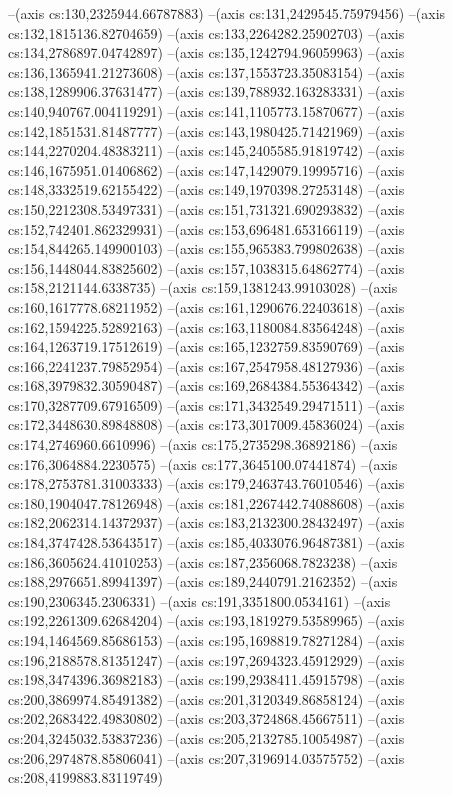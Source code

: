 --(axis cs:130,2325944.66787883)
--(axis cs:131,2429545.75979456)
--(axis cs:132,1815136.82704659)
--(axis cs:133,2264282.25902703)
--(axis cs:134,2786897.04742897)
--(axis cs:135,1242794.96059963)
--(axis cs:136,1365941.21273608)
--(axis cs:137,1553723.35083154)
--(axis cs:138,1289906.37631477)
--(axis cs:139,788932.163283331)
--(axis cs:140,940767.004119291)
--(axis cs:141,1105773.15870677)
--(axis cs:142,1851531.81487777)
--(axis cs:143,1980425.71421969)
--(axis cs:144,2270204.48383211)
--(axis cs:145,2405585.91819742)
--(axis cs:146,1675951.01406862)
--(axis cs:147,1429079.19995716)
--(axis cs:148,3332519.62155422)
--(axis cs:149,1970398.27253148)
--(axis cs:150,2212308.53497331)
--(axis cs:151,731321.690293832)
--(axis cs:152,742401.862329931)
--(axis cs:153,696481.653166119)
--(axis cs:154,844265.149900103)
--(axis cs:155,965383.799802638)
--(axis cs:156,1448044.83825602)
--(axis cs:157,1038315.64862774)
--(axis cs:158,2121144.6338735)
--(axis cs:159,1381243.99103028)
--(axis cs:160,1617778.68211952)
--(axis cs:161,1290676.22403618)
--(axis cs:162,1594225.52892163)
--(axis cs:163,1180084.83564248)
--(axis cs:164,1263719.17512619)
--(axis cs:165,1232759.83590769)
--(axis cs:166,2241237.79852954)
--(axis cs:167,2547958.48127936)
--(axis cs:168,3979832.30590487)
--(axis cs:169,2684384.55364342)
--(axis cs:170,3287709.67916509)
--(axis cs:171,3432549.29471511)
--(axis cs:172,3448630.89848808)
--(axis cs:173,3017009.45836024)
--(axis cs:174,2746960.6610996)
--(axis cs:175,2735298.36892186)
--(axis cs:176,3064884.2230575)
--(axis cs:177,3645100.07441874)
--(axis cs:178,2753781.31003333)
--(axis cs:179,2463743.76010546)
--(axis cs:180,1904047.78126948)
--(axis cs:181,2267442.74088608)
--(axis cs:182,2062314.14372937)
--(axis cs:183,2132300.28432497)
--(axis cs:184,3747428.53643517)
--(axis cs:185,4033076.96487381)
--(axis cs:186,3605624.41010253)
--(axis cs:187,2356068.7823238)
--(axis cs:188,2976651.89941397)
--(axis cs:189,2440791.2162352)
--(axis cs:190,2306345.2306331)
--(axis cs:191,3351800.0534161)
--(axis cs:192,2261309.62684204)
--(axis cs:193,1819279.53589965)
--(axis cs:194,1464569.85686153)
--(axis cs:195,1698819.78271284)
--(axis cs:196,2188578.81351247)
--(axis cs:197,2694323.45912929)
--(axis cs:198,3474396.36982183)
--(axis cs:199,2938411.45915798)
--(axis cs:200,3869974.85491382)
--(axis cs:201,3120349.86858124)
--(axis cs:202,2683422.49830802)
--(axis cs:203,3724868.45667511)
--(axis cs:204,3245032.53837236)
--(axis cs:205,2132785.10054987)
--(axis cs:206,2974878.85806041)
--(axis cs:207,3196914.03575752)
--(axis cs:208,4199883.83119749)
